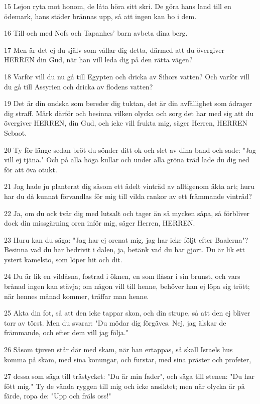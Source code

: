 \par 15 Lejon ryta mot honom, de låta höra sitt skri. De göra hans land till en ödemark, hans städer brännas upp, så att ingen kan bo i dem.
\par 16 Till och med Nofs och Tapanhes' barn avbeta dina berg.
\par 17 Men är det ej du själv som vållar dig detta, därmed att du övergiver HERREN din Gud, när han vill leda dig på den rätta vägen?
\par 18 Varför vill du nu gå till Egypten och dricka av Sihors vatten? Och varför vill du gå till Assyrien och dricka av flodens vatten?
\par 19 Det är din ondska som bereder dig tuktan, det är din avfällighet som ådrager dig straff. Märk därför och besinna vilken olycka och sorg det har med sig att du övergiver HERREN, din Gud, och icke vill frukta mig, säger Herren, HERREN Sebaot.
\par 20 Ty för länge sedan bröt du sönder ditt ok och slet av dina band och sade: "Jag vill ej tjäna." Och på alla höga kullar och under alla gröna träd lade du dig ned för att öva otukt.
\par 21 Jag hade ju planterat dig såsom ett ädelt vinträd av alltigenom äkta art; huru har du då kunnat förvandlas för mig till vilda rankor av ett främmande vinträd?
\par 22 Ja, om du ock tvår dig med lutsalt och tager än så mycken såpa, så förbliver dock din missgärning oren inför mig, säger Herren, HERREN.
\par 23 Huru kan du säga: "Jag har ej orenat mig, jag har icke följt efter Baalerna"? Besinna vad du har bedrivit i dalen, ja, betänk vad du har gjort. Du är lik ett ystert kamelsto, som löper hit och dit.
\par 24 Du är lik en vildåsna, fostrad i öknen, en som flåsar i sin brunst, och vars brånad ingen kan stävja; om någon vill till henne, behöver han ej löpa sig trött; när hennes månad kommer, träffar man henne.
\par 25 Akta din fot, så att den icke tappar skon, och din strupe, så att den ej bliver torr av törst. Men du svarar: "Du mödar dig förgäves. Nej, jag älskar de främmande, och efter dem vill jag följa."
\par 26 Såsom tjuven står där med skam, när han ertappas, så skall Israels hus komma på skam, med sina konungar, och furstar, med sina präster och profeter,
\par 27 dessa som säga till trästycket: "Du är min fader", och säga till stenen: "Du har fött mig." Ty de vända ryggen till mig och icke ansiktet; men när olycka är på färde, ropa de: "Upp och fräls oss!"

